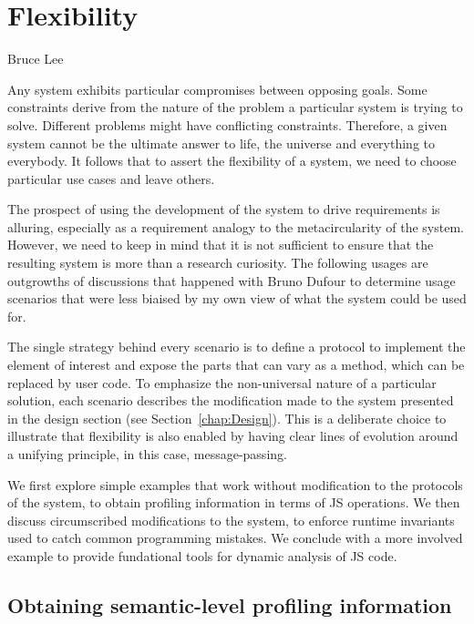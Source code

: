 \chapter{Flexibility}
\label{chap:Flexibility}

{Bruce Lee}

Any system exhibits particular compromises between opposing goals. Some
constraints derive from the nature of the problem a particular system is trying
to solve. Different problems might have conflicting constraints. Therefore, a
given system cannot be the ultimate answer to life, the universe and everything
to everybody. It follows that to assert the flexibility of a system, we need to
choose particular use cases and leave others.

The prospect of using the development of the system to drive requirements is
alluring, especially as a requirement analogy to the metacircularity of the
system. However, we need to keep in mind that it is not sufficient to ensure
that the resulting system is more than a research curiosity. The following
usages are outgrowths of discussions that happened with Bruno Dufour to
determine usage scenarios that were less biaised by my own view of what the
system could be used for.

The single strategy behind every scenario is to define a protocol to implement
the element of interest and expose the parts that can vary as a method, which
can be replaced by user code. To emphasize the non-universal nature of a
particular solution, each scenario describes the modification made to the
system presented in the design section (see Section~\ref{chap:Design}).  This
is a deliberate choice to illustrate that flexibility is also enabled by having
clear lines of evolution around a unifying principle, in this case,
message-passing.

We first explore simple examples that work without modification to the
protocols of the system, to obtain profiling information in terms of JS operations.
We then discuss circumscribed modifications to the system, to enforce runtime
invariants used to catch common programming mistakes. We conclude with a more
involved example to provide fundational tools for dynamic analysis of JS code.

\section{Obtaining semantic-level profiling information}

